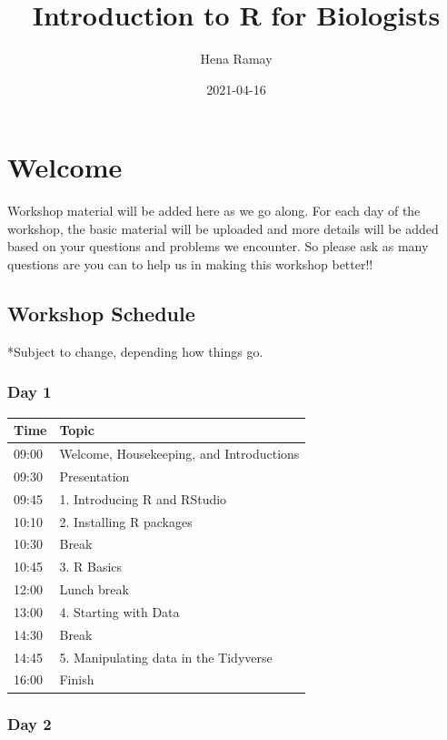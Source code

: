 \documentclass[
]{book}
\title{Introduction to R for Biologists}
\author{Hena Ramay}
\date{2021-04-16}
\begin{document}
\maketitle

{
\setcounter{tocdepth}{1}
\tableofcontents
}
\hypertarget{welcome}{%
\chapter{Welcome}\label{welcome}}

Workshop material will be added here as we go along. For each day of the workshop, the basic material will be uploaded and more details will be added based on your questions and problems we encounter. So please ask as many questions are you can to help us in making this workshop better!!

\hypertarget{workshop-schedule}{%
\section{Workshop Schedule}\label{workshop-schedule}}

*Subject to change, depending how things go.

\hypertarget{day-1}{%
\subsection*{Day 1}\label{day-1}}

\begin{longtable}[]{@{}ll@{}}
\toprule
Time & Topic \\
\midrule
\endhead
09:00 & Welcome, Housekeeping, and Introductions \\
09:30 & Presentation \\
09:45 & 1. Introducing R and RStudio \\
10:10 & 2. Installing R packages \\
10:30 & Break \\
10:45 & 3. R Basics \\
12:00 & Lunch break \\
13:00 & 4. Starting with Data \\
14:30 & Break \\
14:45 & 5. Manipulating data in the Tidyverse \\
16:00 & Finish \\
\bottomrule
\end{longtable}

\hypertarget{day-2}{%
\subsection*{Day 2}\label{day-2}}
\end{document}
